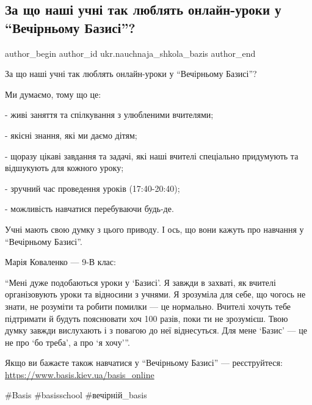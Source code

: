  
 
 
 
 

\subsection{За що наші учні так люблять онлайн-уроки у \enquote{Вечірньому Базисі}?}
\label{sec:20_01_2023.fb.ukr.nauchnaja_shkola_bazis.1.za_shcho_nash__uchn_}

\ifcmt
 author_begin
   author_id ukr.nauchnaja_shkola_bazis
 author_end
\fi

За що наші учні так люблять онлайн-уроки у \enquote{Вечірньому Базисі}? 

Ми думаємо, тому що це:

- живі заняття та спілкування з улюбленими вчителями;

- якісні знання, які ми даємо дітям;

- щоразу цікаві завдання та задачі, які наші вчителі спеціально придумують та
відшукують для кожного уроку;

- зручний час проведення уроків (17:40-20:40);

- можливість навчатися перебуваючи будь-де. 

Учні мають свою думку з цього приводу. І ось, що вони кажуть про навчання у
\enquote{Вечірньому Базисі}.

Марія Коваленко — 9-В клас: 

\enquote{Мені дуже подобаються уроки у \enquote{Базисі}. Я завжди в захваті, як вчителі
організовують уроки та відносини з учнями. Я зрозуміла для себе, що чогось не
знати, не розуміти та робити помилки — це нормально. Вчителі хочуть тебе
підтримати й будуть пояснювати хоч 100 разів, поки ти не зрозумієш. Твою думку
завжди  вислухають і з повагою до неї віднесуться. Для мене \enquote{Базис} — це не про
\enquote{бо треба}, а про \enquote{я хочу}}.

Якщо ви бажаєте також навчатися у \enquote{Вечірньому Базисі} — реєструйтеся:
\url{https://www.basis.kiev.ua/basis_online} 

\#Basis \#basisschool \#вечірній\_basis
